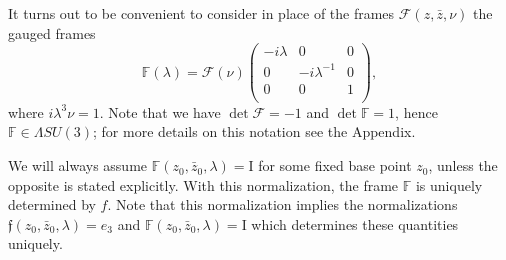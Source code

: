 \documentclass[a4paper,11pt]{amsart}
\theoremstyle{definition}
\numberwithin{equation}{section}
\newcommand{\F}{\mathbb{F}}
\newcommand{\f}{\mathfrak{f}}
\begin{document}
It turns out to be convenient to consider in place of the  frames $\mathcal{F}(z,\bar{z}, \nu)$ the gauged frames 
\begin{equation} \label{F}
\mathbb{F}(\lambda)=\mathcal{F}(\nu)\left(
                                   \begin{array}{ccc}
                                     -i\lambda & 0 & 0 \\
                                     0 &  -i\lambda^{-1} & 0 \\
                                     0 & 0 &  1 \\
                                   \end{array}
                                 \right),
\end{equation}
where $i\lambda^3 \nu=1$. Note that we have  $\det \mathcal{F} = -1$ and  
$\det \F = 1$, 
hence  $\F \in \Lambda SU(3)$; for more details on this notation see the Appendix. 

 We will always assume $\mathbb{F}(z_0,\bar{z}_0, \lambda) = \mathrm{I}$ for some fixed base point $z_0$, unless the opposite is stated explicitly. With this normalization, the frame $\mathbb{F}$ is uniquely determined by $f$. Note that this normalization implies the normalizations 
 $\f (z_0, \bar{z}_0,\lambda) = e_3$ and $\mathbb{F}(z_0, \bar{z}_0,\lambda) = \mathrm{I}$ which determines these quantities uniquely.
\end{document}
